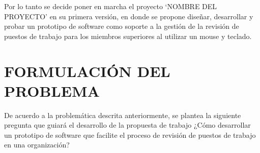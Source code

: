 Por lo tanto se decide poner en marcha el proyecto ‘NOMBRE DEL PROYECTO’ en su primera versión, en donde se propone diseñar, desarrollar y probar un prototipo de software como soporte a la gestión de la revisión de puestos de trabajo para los miembros superiores al utilizar un mouse y teclado.

\section{FORMULACIÓN DEL PROBLEMA}
De acuerdo a la problemática descrita anteriormente, se plantea la siguiente pregunta que guiará el desarrollo de la propuesta de trabajo ¿Cómo desarrollar un prototipo de software que facilite el proceso de revisión de puestos de trabajo en una organización?